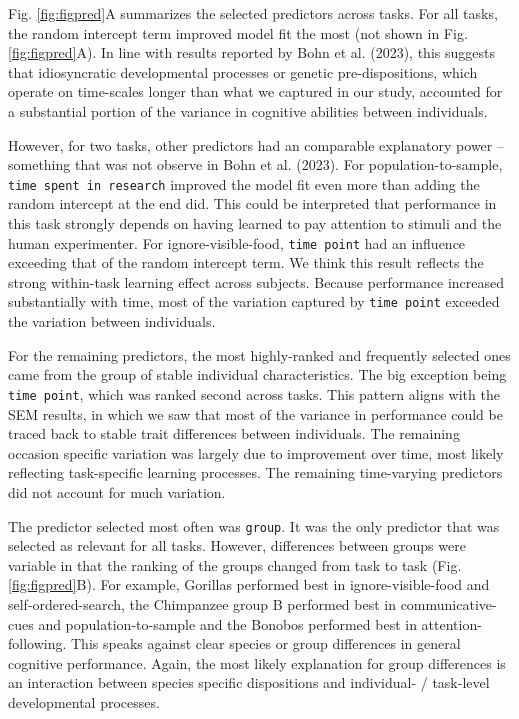 \documentclass[
  man,floatsintext]{apa6}
\begin{document}
Fig. \ref{fig:figpred}A summarizes the selected predictors across tasks. For all tasks, the random intercept term improved model fit the most (not shown in Fig. \ref{fig:figpred}A). In line with results reported by Bohn et al. (2023), this suggests that idiosyncratic developmental processes or genetic pre-dispositions, which operate on time-scales longer than what we captured in our study, accounted for a substantial portion of the variance in cognitive abilities between individuals.

However, for two tasks, other predictors had an comparable explanatory power -- something that was not observe in Bohn et al. (2023). For population-to-sample, \texttt{time\ spent\ in\ research} improved the model fit even more than adding the random intercept at the end did. This could be interpreted that performance in this task strongly depends on having learned to pay attention to stimuli and the human experimenter. For ignore-visible-food, \texttt{time\ point} had an influence exceeding that of the random intercept term. We think this result reflects the strong within-task learning effect across subjects. Because performance increased substantially with time, most of the variation captured by \texttt{time\ point} exceeded the variation between individuals.

For the remaining predictors, the most highly-ranked and frequently selected ones came from the group of stable individual characteristics. The big exception being \texttt{time\ point}, which was ranked second across tasks. This pattern aligns with the SEM results, in which we saw that most of the variance in performance could be traced back to stable trait differences between individuals. The remaining occasion specific variation was largely due to improvement over time, most likely reflecting task-specific learning processes. The remaining time-varying predictors did not account for much variation.

The predictor selected most often was \texttt{group}. It was the only predictor that was selected as relevant for all tasks. However, differences between groups were variable in that the ranking of the groups changed from task to task (Fig. \ref{fig:figpred}B). For example, Gorillas performed best in ignore-visible-food and self-ordered-search, the Chimpanzee group B performed best in communicative-cues and population-to-sample and the Bonobos performed best in attention-following. This speaks against clear species or group differences in general cognitive performance. Again, the most likely explanation for group differences is an interaction between species specific dispositions and individual- / task-level developmental processes.
\end{document}

